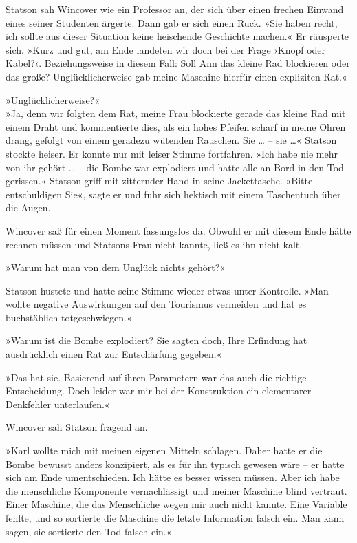 Statson sah Wincover wie ein Professor an, der sich über einen
frechen Einwand eines seiner Studenten ärgerte. Dann gab er sich
einen Ruck. »Sie haben recht, ich sollte aus dieser Situation keine
heischende Geschichte machen.« Er räusperte sich. »Kurz und gut, am
Ende landeten wir doch bei der Frage ›Knopf oder Kabel?‹.
Beziehungsweise in diesem Fall: Soll Ann das kleine Rad blockieren
oder das große? Unglücklicherweise gab meine Maschine hierfür einen
expliziten Rat.«

»Unglücklicherweise?«\\ »Ja, denn wir folgten dem Rat, meine Frau
blockierte gerade das kleine Rad mit einem Draht und kommentierte
dies, als ein hohes Pfeifen scharf in meine Ohren drang, gefolgt
von einem geradezu wütenden Rauschen. Sie \ldots{} – sie \ldots{}« Statson
stockte heiser. Er konnte nur mit leiser Stimme fortfahren. »Ich
habe nie mehr von ihr gehört \ldots{} – die Bombe war explodiert und
hatte alle an Bord in den Tod gerissen.« Statson griff mit
zitternder Hand in seine Jackettasche. »Bitte entschuldigen Sie«,
sagte er und fuhr sich hektisch mit einem Taschentuch über die
Augen.

Wincover saß für einen Moment fassungslos da. Obwohl er mit diesem
Ende hätte rechnen müssen und Statsons Frau nicht kannte, ließ es
ihn nicht kalt.

»Warum hat man von dem Unglück nichts gehört?«

Statson hustete und hatte seine Stimme wieder etwas unter
Kontrolle. »Man wollte negative Auswirkungen auf den Tourismus
vermeiden und hat es buchstäblich totgeschwiegen.«

»Warum ist die Bombe explodiert? Sie sagten doch, Ihre Erfindung
hat ausdrücklich einen Rat zur Entschärfung gegeben.«

»Das hat sie. Basierend auf ihren Parametern war das auch die
richtige Entscheidung. Doch leider war mir bei der Konstruktion ein
elementarer Denkfehler unterlaufen.«

Wincover sah Statson fragend an.

»Karl wollte mich mit meinen eigenen Mitteln schlagen. Daher hatte
er die Bombe bewusst anders konzipiert, als es für ihn typisch
gewesen wäre – er hatte sich am Ende umentschieden. Ich hätte es
besser wissen müssen. Aber ich habe die menschliche Komponente
vernachlässigt und meiner Maschine blind vertraut. Einer Maschine,
die das Menschliche wegen mir auch nicht kannte. Eine Variable
fehlte, und so sortierte die Maschine die letzte Information falsch
ein. Man kann sagen, sie sortierte den Tod falsch ein.«

